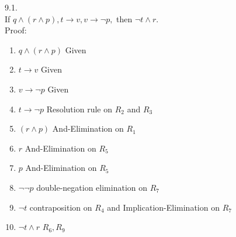 \documentclass[a4paper]{article}
\begin{document}
9.1.\\
If $q \wedge (r \wedge p) , t \rightarrow v, v  \rightarrow  \neg p,$ then $ \neg t \wedge r.$\\
Proof:\\
\begin{enumerate}[1.]
\item $q \wedge (r \wedge p)$ \hfill Given
\item $t  \rightarrow v$ \hfill Given
\item $v  \rightarrow  \neg p$ \hfill Given
\item $t  \rightarrow  \neg p$ \hfill Resolution rule on $R_2$ and $R_3$
\item $(r \wedge p)$ \hfill And-Elimination on $R_1$
\item $r$ \hfill And-Elimination on $R_5$
\item $p$ \hfill And-Elimination on $R_5$
\item $ \neg  \neg p$ \hfill double-negation elimination on $R_7$
\item $ \neg t$ \hfill contraposition on $R_4$ and Implication-Elimination on $R_7$
\item $ \neg t \wedge r$ \hfill $R_6, R_9$
\end{enumerate}
\end{document}
